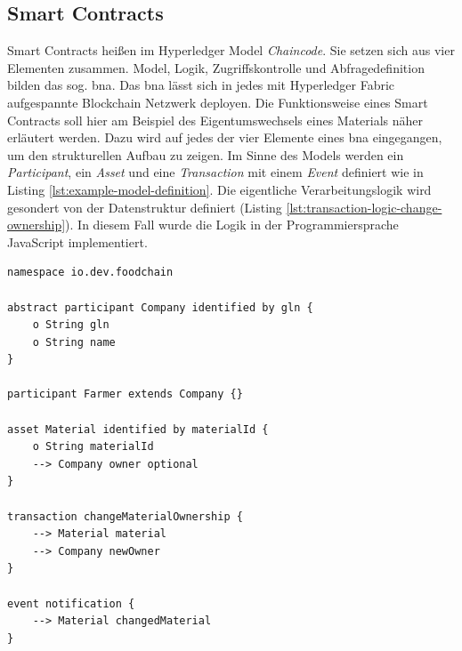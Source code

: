 \subsection{Smart Contracts}
Smart Contracts heißen im Hyperledger Model \textit{Chaincode}. Sie setzen sich aus vier Elementen zusammen. Model, Logik, Zugriffskontrolle und Abfragedefinition bilden das sog. \acf{bna}. Das \ac{bna} lässt sich in jedes mit Hyperledger Fabric aufgespannte Blockchain Netzwerk deployen. Die Funktionsweise eines Smart Contracts soll hier am Beispiel des Eigentumswechsels eines Materials näher erläutert werden. Dazu wird auf jedes der vier Elemente eines \ac{bna} eingegangen, um den strukturellen Aufbau zu zeigen. Im Sinne des Models werden ein \textit{Participant}, ein \textit{Asset} und eine \textit{Transaction} mit einem \textit{Event} definiert wie in Listing \ref{lst:example-model-definition}. Die eigentliche Verarbeitungslogik wird gesondert von der Datenstruktur definiert (Listing \ref{lst:transaction-logic-change-ownership}). In diesem Fall wurde die Logik in der Programmiersprache JavaScript implementiert.

\begin{lstlisting}[caption={Model Example Definition},label=lst:example-model-definition]
namespace io.dev.foodchain

abstract participant Company identified by gln {
    o String gln
    o String name
}

participant Farmer extends Company {}

asset Material identified by materialId {
    o String materialId
    --> Company owner optional
}

transaction changeMaterialOwnership {
    --> Material material
    --> Company newOwner
}

event notification {
    --> Material changedMaterial
}
\end{lstlisting}

